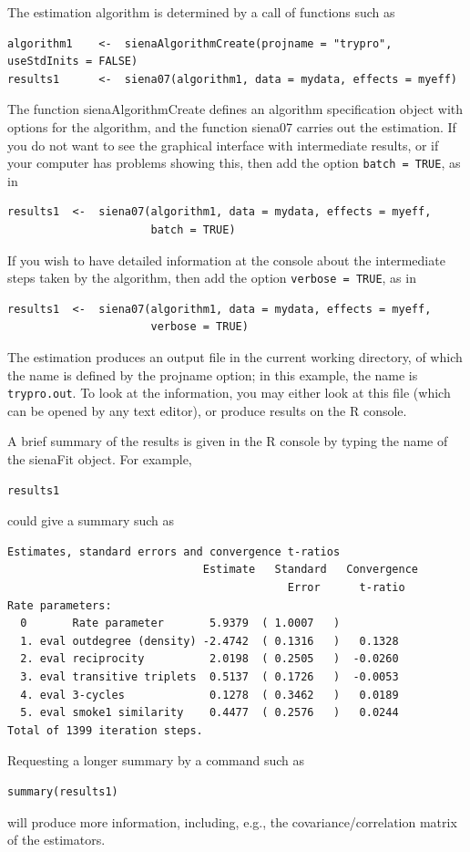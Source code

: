 \documentclass[a4paper,fleqn,11pt]{article}
\newcommand{\+}{\, + \,}
\newcommand{\R}{{\sf R }}
\begin{document}
The estimation algorithm is determined by a call of functions
such as
\begin{verbatim}
algorithm1    <-  sienaAlgorithmCreate(projname = "trypro", useStdInits = FALSE)
results1      <-  siena07(algorithm1, data = mydata, effects = myeff)
\end{verbatim}
The function \textsf{sienaAlgorithmCreate} defines an algorithm specification
object with options for the algorithm, and the function  \textsf{siena07}
carries out the estimation.
If you do not want to see the graphical interface with intermediate
results, or if your computer has problems showing this, then add
the option \texttt{batch = TRUE}, as in
\begin{verbatim}
results1  <-  siena07(algorithm1, data = mydata, effects = myeff,
                      batch = TRUE)
\end{verbatim}
If you wish to have detailed information at the console about the intermediate
steps taken by the algorithm, then add
the option \texttt{verbose = TRUE}, as in
\begin{verbatim}
results1  <-  siena07(algorithm1, data = mydata, effects = myeff,
                      verbose = TRUE)
\end{verbatim}


The estimation produces an output file in the current working directory,
of which the name is defined by the \textsf{projname} option;
in this example, the name is \texttt{trypro.out}.
To look at the information, you may either look at this file
(which can be opened by any text editor), or produce results on the \R console.

A brief summary of the results is given in the \R console by
typing the name of the  \textsf{sienaFit} object. For example,
\begin{verbatim}
results1
\end{verbatim}
could give a summary such as
\par
{\footnotesize
\begin{verbatim}
Estimates, standard errors and convergence t-ratios
                              Estimate   Standard   Convergence
                                           Error      t-ratio
Rate parameters:
  0       Rate parameter       5.9379  ( 1.0007   )
  1. eval outdegree (density) -2.4742  ( 0.1316   )   0.1328
  2. eval reciprocity          2.0198  ( 0.2505   )  -0.0260
  3. eval transitive triplets  0.5137  ( 0.1726   )  -0.0053
  4. eval 3-cycles             0.1278  ( 0.3462   )   0.0189
  5. eval smoke1 similarity    0.4477  ( 0.2576   )   0.0244
Total of 1399 iteration steps.
\end{verbatim}
}
Requesting a longer summary by a command such as
\begin{verbatim}
summary(results1)
\end{verbatim}
will produce more information, including, e.g.,
the covariance/correlation matrix of the estimators.
\end{document}
